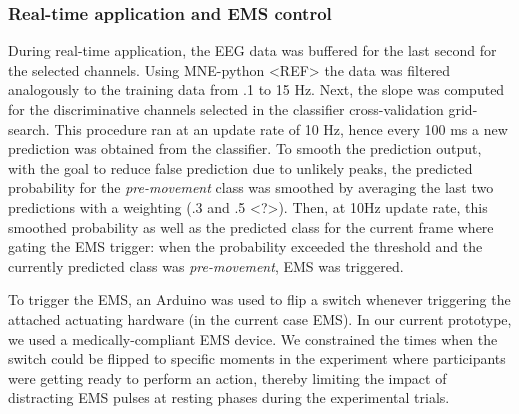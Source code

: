 \subsubsection{Real-time application and EMS control}
During real-time application, the EEG data was buffered for the last second for the selected channels. Using MNE-python <REF> the data was filtered analogously to the training data from .1 to 15 Hz. Next, the slope was computed for the discriminative channels selected in the classifier cross-validation grid-search. This procedure ran at an update rate of 10 Hz, hence every 100 ms a new prediction was obtained from the classifier. To smooth the prediction output, with the goal to reduce false prediction due to unlikely peaks, the predicted probability for the \textit{pre-movement} class was smoothed by averaging the last two predictions with a weighting (.3 and .5 <?>). Then, at 10Hz update rate, this smoothed probability as well as the predicted class for the current frame where gating the EMS trigger: when the probability exceeded the threshold and the currently predicted class was \textit{pre-movement}, EMS was triggered.

To trigger the EMS, an Arduino was used to flip a switch whenever triggering the attached actuating hardware (in the current case EMS). In our current prototype, we used a medically-compliant EMS device. We constrained the times when the switch could be flipped to specific moments in the experiment where participants were getting ready to perform an action, thereby limiting the impact of distracting EMS pulses at resting phases during the experimental trials. %




